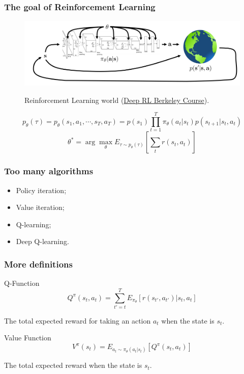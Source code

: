 \documentclass{beamer}
\begin{document}
        \begin{frame}
            \frametitle{The goal of Reinforcement Learning}
            \begin{figure}
                \centering
                \caption{Reinforcement Learning world (\href{http://rail.eecs.berkeley.edu/deeprlcourse-fa18/static/slides/lec-4.pdf}{Deep RL Berkeley Course}).}
                \includegraphics[width=0.9\linewidth]{figures/goal_rl.png}
                \label{fig:1}
            \end{figure}
            $$p_{\theta}(\tau) = p_{\theta}(s_1, a_1, \cdots, s_T, a_T) = p(s_1) \prod_{t=1}^T \pi_{\theta}(a_t|s_t)p(s_{t+1}|s_t, a_t)$$
            $$\theta^* = \arg\max_\theta E_{\tau \sim p_\theta(\tau)}\left[\sum_t r(s_t, a_t)\right]$$
        \end{frame}

        \begin{frame}
            \frametitle{Too many algorithms}
            \begin{itemize}
                \item Policy iteration;
                \item Value iteration;
                \item Q-learning;
                \item Deep Q-learning.
            \end{itemize}
        \end{frame}

        \begin{frame}
            \frametitle{More definitions}
            \begin{block}{Q-Function}
                $$Q^\pi(s_t, a_t) = \sum_{t'=t}^T E_{\pi_\theta}[r(s_{t'}, a_{t'})|s_t, a_t]$$

                The total expected reward for taking an action $a_t$ when the state is $s_t$.
            \end{block}
            \begin{block}{Value Function}
                $$V^\pi(s_t) = E_{a_t \sim \pi_\theta(a_t|s_t)}[Q^\pi(s_t, a_t)]$$

                The total expected reward when the state is $s_t$.
            \end{block}
        \end{frame}
\end{document}
